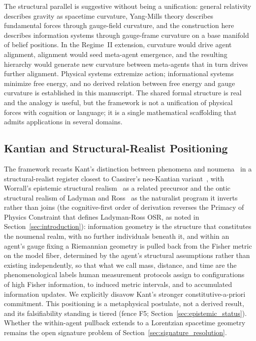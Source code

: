 \documentclass[11pt]{article}
\begin{document}
The structural parallel is suggestive without being a unification: general relativity describes gravity as spacetime curvature, Yang-Mills theory describes fundamental forces through gauge-field curvature, and the construction here describes information systems through gauge-frame curvature on a base manifold of belief positions. In the Regime~II extension, curvature would drive agent alignment, alignment would seed meta-agent emergence, and the resulting hierarchy would generate new curvature between meta-agents that in turn drives further alignment. Physical systems extremize action; informational systems minimize free energy, and no derived relation between free energy and gauge curvature is established in this manuscript. The shared formal structure is real and the analogy is useful, but the framework is not a unification of physical forces with cognition or language; it is a single mathematical scaffolding that admits applications in several domains.

\subsection{Kantian and Structural-Realist Positioning}

The framework recasts Kant's distinction between phenomena and noumena~\cite{Kant1781} in a structural-realist register closest to Cassirer's neo-Kantian variant~\cite{Cassirer1923}, with Worrall's epistemic structural realism~\cite{Worrall1989} as a related precursor and the ontic structural realism of Ladyman and Ross~\cite{Ladyman2007} as the naturalist program it inverts rather than joins (the cognitive-first order of derivation reverses the Primacy of Physics Constraint that defines Ladyman-Ross OSR, as noted in Section~\ref{sec:introduction}): information geometry is the structure that constitutes the noumenal realm, with no further individuals beneath it, and within an agent's gauge fixing a Riemannian geometry is pulled back from the Fisher metric on the model fiber, determined by the agent's structural assumptions rather than existing independently, so that what we call mass, distance, and time are the phenomenological labels human measurement protocols assign to configurations of high Fisher information, to induced metric intervals, and to accumulated information updates. We explicitly disavow Kant's stronger constitutive-a-priori commitment. This positioning is a metaphysical postulate, not a derived result, and its falsifiability standing is tiered (fence F5; Section~\ref{sec:epistemic_status}). Whether the within-agent pullback extends to a Lorentzian spacetime geometry remains the open signature problem of Section~\ref{sec:signature_resolution}.
\end{document}
